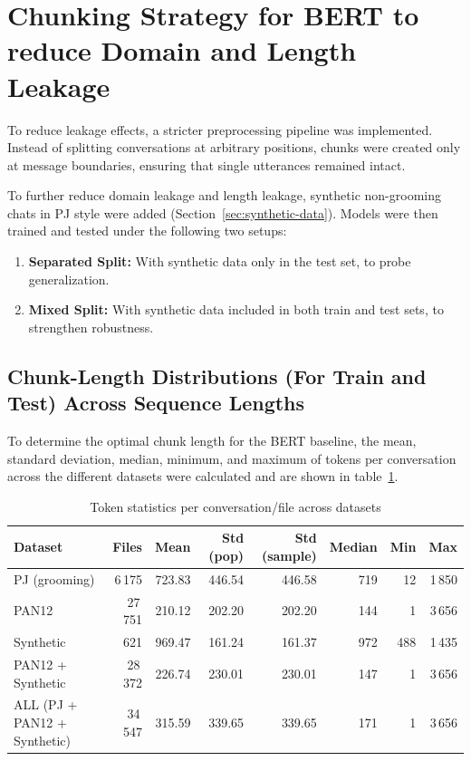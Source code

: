 \section{Chunking Strategy for BERT to reduce Domain and Length Leakage}

To reduce leakage effects, a stricter preprocessing pipeline was implemented. Instead of splitting conversations at arbitrary positions, chunks were created only at message boundaries, ensuring that single utterances remained intact.

To further reduce domain leakage and length leakage, synthetic non-grooming chats in PJ style were added (Section~\ref{sec:synthetic-data}). Models were then trained and tested under the following two setups: 

\begin{enumerate}
  \item \textbf{Separated Split:} With synthetic data only in the test set, to probe generalization.
  \item \textbf{Mixed Split:} With synthetic data included in both train and test sets, to strengthen robustness.
\end{enumerate}


\subsection{Chunk-Length Distributions (For Train and Test) Across Sequence Lengths}\label{sec:chunk-length-distributions}

To determine the optimal chunk length for the BERT baseline, the mean, standard deviation, median, minimum, and maximum of tokens per conversation across the different datasets were calculated and are shown in table~\ref{tab:token_stats}. 

\begin{table}[H]
\centering
\caption{Token statistics per conversation/file across datasets}
\label{tab:token_stats}
\begin{tabular}{lrrrrrrr}
\toprule
\textbf{Dataset} & \textbf{Files} & \textbf{Mean} & \textbf{Std (pop)} & \textbf{Std (sample)} & \textbf{Median} & \textbf{Min} & \textbf{Max} \\
\midrule
PJ (grooming)                & 6\,175  & 723.83 & 446.54 & 446.58 & 719  & 12  & 1\,850 \\
PAN12                        & 27\,751 & 210.12 & 202.20 & 202.20 & 144  & 1   & 3\,656 \\
Synthetic                    & 621     & 969.47 & 161.24 & 161.37 & 972  & 488 & 1\,435 \\
PAN12 + Synthetic            & 28\,372 & 226.74 & 230.01 & 230.01 & 147  & 1   & 3\,656 \\
ALL (PJ + PAN12 + Synthetic) & 34\,547 & 315.59 & 339.65 & 339.65 & 171  & 1   & 3\,656 \\
\bottomrule
\end{tabular}
\end{table}


